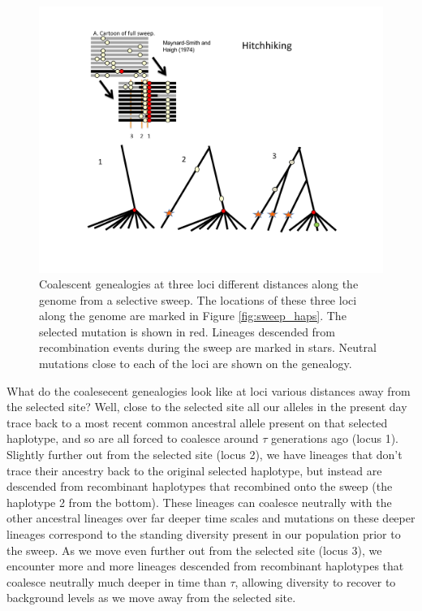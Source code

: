 \begin{figure}
\begin{center}
\includegraphics[width= 0.9 \textwidth]{figures/Hitchhiking/recom_haps_coal_sweep.pdf}
\end{center}
\caption{Coalescent genealogies at three loci different distances along the genome from a selective sweep. The locations of these three loci along the genome are marked in Figure \ref{fig:sweep_haps}. The selected mutation is shown in red. Lineages descended from recombination events during the sweep are marked in stars. Neutral mutations close to each of the loci are shown on the genealogy.} \label{fig:sweep_haps_coal}
\end{figure}

What do the coalesecent genealogies look like at loci various distances away from the
selected site? Well, close to the selected site all our alleles in the
present day trace back to a most recent common ancestral allele
present on that selected haplotype, and so are all forced to coalesce
around $\tau$ generations ago (locus 1). Slightly further out from the selected
site (locus 2), we have lineages that don't trace their ancestry back
to the original selected haplotype, but instead are descended from
recombinant haplotypes that recombined onto the sweep (the haplotype 2 from the
bottom). These lineages can coalesce neutrally with the other ancestral lineages
over far deeper time scales and mutations on these deeper lineages
correspond to the standing diversity present in our population
prior to the sweep. As we move even further out from the selected site
(locus 3), we encounter more and more lineages descended from
recombinant haplotypes that coalesce neutrally much deeper in time than $\tau$, 
allowing diversity to recover to background levels as we move away
from the selected site.

